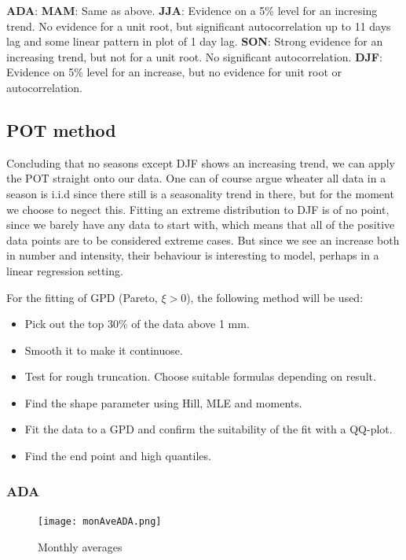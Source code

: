 \documentclass{article}
\begin{document}
	{\Large\textbf{ADA}}: \textbf{MAM}: Same as above. \textbf{JJA}: Evidence on a 5\% level for an incresing trend. No evidence for a unit root, but significant autocorrelation up to 11 days lag and some linear pattern in plot of 1 day lag. \textbf{SON}: Strong evidence for an increasing trend, but not for a unit root. No significant autocorrelation. \textbf{DJF}: Evidence on 5\% level for an increase, but no evidence for unit root or autocorrelation.  
	
	\subsection{POT method}
	Concluding that no seasons except DJF shows an increasing trend, we can apply the POT straight onto our data. One can of course argue wheater all data in a season is i.i.d since there still is a seasonality trend in there, but for the moment we choose to negect this. Fitting an extreme distribution to DJF is of no point, since we barely have any data to start with, which means that all of the positive data points are to be considered extreme cases. But since we see an increase both in number and intensity, their behaviour is interesting to model, perhaps in a linear regression setting.
	
	For the fitting of GPD (Pareto, $\xi > 0$), the following method will be used:
	\begin{itemize}
		\item Pick out the top 30\% of the data above 1 mm.
		\item Smooth it to make it continuose.
		\item Test for rough truncation. Choose suitable formulas depending on result.
		\item Find the shape parameter using Hill, MLE and moments.
		\item Fit the data to a GPD and confirm the suitability of the fit with a QQ-plot.
		\item Find the end point and high quantiles. 
	\end{itemize}
	
	\subsubsection{ADA}
	\begin{figure}[H]
		\centering
		\texttt{[image: monAveADA.png]}
		\caption{Monthly averages}
	\end{figure}
	
\end{document}
